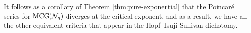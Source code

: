 It follows as a corollary of Theorem \ref{thm:pure-exponential} that the Poincaré series for $\mathrm{MCG}(\mathcal{N}_g)$ diverges at the critical exponent, and as a result, we have all the other equivalent criteria that appear in the Hopf-Tsuji-Sullivan dichotomy.




